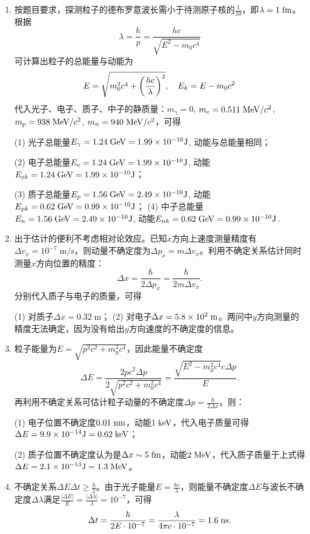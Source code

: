 \begin{enumerate}[label=2.\arabic*, leftmargin=-0.5mm]

\item
按题目要求，探测粒子的德布罗意波长需小于待测原子核的$\frac{1}{10}$，即$\lambda = 1\;\mathrm{fm}$。根据
\[\lambda = \frac{h}{p} = \frac{hc}{\sqrt{E^2-m_0c^4}}\]
可计算出粒子的总能量与动能为
\[E = \sqrt{m_0^2c^4+\qty(\frac{hc}{\lambda})^2},\quad E_k = E-m_0c^2\]
代入光子、电子、质子、中子的静质量：$m_\gamma=0$, $m_e=0.511\;\mathrm{MeV}/c^2$, $m_p=938\;\mathrm{MeV}/c^2$, $m_n=940\;\mathrm{MeV}/c^2$，可得

(1) 光子总能量$E_\gamma=1.24\;\mathrm{GeV}=1.99\times 10^{-10}\mathrm{J}$, 动能与总能量相同；

(2) 电子总能量$E_e = 1.24\;\mathrm{GeV} = 1.99\times 10^{-10}\mathrm{J}$, 动能$E_{ek} = 1.24\;\mathrm{GeV} = 1.99\times 10^{-10}\mathrm{J}$；

(3) 质子总能量$E_p = 1.56\;\mathrm{GeV} = 2.49\times 10^{-10}\mathrm{J}$, 动能$E_{pk} = 0.62\;\mathrm{GeV} = 0.99\times 10^{-10}\mathrm{J}$；
(4) 中子总能量$E_n = 1.56\;\mathrm{GeV} = 2.49\times 10^{-10}\mathrm{J}$, 动能$E_{nk} = 0.62\;\mathrm{GeV} = 0.99\times 10^{-10}\mathrm{J}$.

\item
出于估计的便利不考虑相对论效应。已知$x$方向上速度测量精度有$\Delta v_x=10^{-7}\;\mathrm{m/s}$，则动量不确定度为$\Delta p_x=m\Delta v_x$。利用不确定关系估计同时测量$x$方向位置的精度：
\[\Delta x = \frac{\hbar}{2\Delta p_x} = \frac{\hbar}{2m\Delta v_x}.\]
分别代入质子与电子的质量，可得

(1) 对质子$\Delta x=0.32\;\mathrm{m}$； (2) 对电子$\Delta x=5.8\times 10^{2}\;\mathrm{m}$。两问中$y$方向测量的精度无法确定，因为没有给出$y$方向速度的不确定度的信息。

\item
粒子能量为$E=\sqrt{p^2c^2+m_0^2c^4}$，因此能量不确定度
\[\Delta E = \frac{2pc^2\Delta p}{2\sqrt{p^2c^2+m_0^2c^4}} = \frac{\sqrt{E^2-m_0^2c^4} c\Delta p}{E}.\]
再利用不确定关系可估计粒子动量的不确定度$\Delta p = \frac{\hbar}{2\Delta x}$，则：

(1) 电子位置不确定度$0.01\;\mathrm{nm}$，动能$1\;\mathrm{keV}$，代入电子质量可得$\Delta E =9.9\times 10^{-14}\mathrm{J} = 0.62\;\mathrm{keV}$；

(2) 质子位置不确定度认为是$\Delta x\sim 5\;\mathrm{fm}$，动能$2\;\mathrm{MeV}$，代入质子质量于上式得$\Delta E=2.1\times 10^{-13}\mathrm{J}=1.3\;\mathrm{MeV}$。

\item
不确定关系$\Delta E\Delta t\geq \frac{\hbar}{2}$。由于光子能量$E=\frac{hc}{\lambda}$，则能量不确定度$\Delta E$与波长不确定度$\Delta \lambda$满足$\frac{|\Delta E|}{E} =\frac{|\Delta\lambda|}{\lambda}=10^{-7} $，可得
\[\Delta t = \frac{\hbar}{2E\cdot 10^{-7}} = \frac{\lambda}{4\pi c\cdot10^{-7}}=1.6\;\mathrm{ns}.\]


\end{enumerate}
